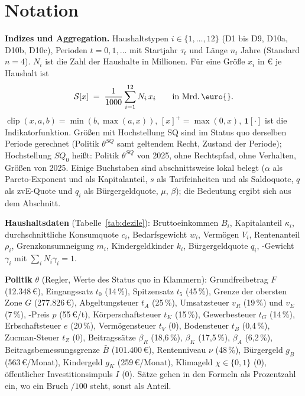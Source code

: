 %

\section{Notation}
\label{sec:notation}

\textbf{Indizes und Aggregation.} Haushaltstypen $i\in\{1,\dots,12\}$ (D1 bis D9, D10a, D10b,
D10c), Perioden $t=0,1,\dots$ mit Startjahr $\tau_t$ und Länge $n_t$ Jahre (Standard $n=4$).
$N_i$ ist die Zahl der Haushalte in Millionen. Für eine Größe $x_i$ in \euro{} je Haushalt ist
\begin{equation}
  \mathcal{S}[x] \;=\; \frac{1}{1000}\sum_{i=1}^{12} N_i\,x_i \qquad\text{in Mrd.\,\euro{}.}
\end{equation}
$\operatorname{clip}(x,a,b)=\min(b,\max(a,x))$, $[x]^+=\max(0,x)$, $\mathbf{1}[\cdot]$ ist die
Indikatorfunktion. Größen mit Hochstellung SQ sind im Status quo derselben Periode
gerechnet (Politik $\theta^{SQ}$ samt geltendem Recht, Zustand der Periode); Hochstellung
$SQ_0$ heißt: Politik $\theta^{SQ}$ von 2025, ohne Rechtspfad, ohne Verhalten, Größen von 2025.
Einige Buchstaben sind abschnittsweise lokal belegt ($\alpha$ als Pareto-Exponent und als
Kapitalanteil, $s$ als Tarifeinheiten und als Saldoquote, $q$ als zvE-Quote und $q_i$ als
Bürgergeldquote, $\mu$, $\beta$); die Bedeutung ergibt sich aus dem Abschnitt.

\textbf{Haushaltsdaten} (Tabelle~\ref{tab:dezile}): Bruttoeinkommen $B_i$, Kapitalanteil
$\kappa_i$, durchschnittliche Konsumquote $c_i$, Bedarfsgewicht $w_i$, Vermögen $V_i$,
Rentenanteil $\rho_i$, Grenzkonsumneigung $m_i$, Kindergeldkinder $k_i$, Bürgergeldquote $q_i$,
\COz-Gewicht $\gamma_i$ mit $\sum_i N_i\gamma_i=1$.

\textbf{Politik} $\theta$ (Regler, Werte des Status quo in Klammern): Grundfreibetrag $F$
(12.348\,\euro), Eingangssatz $t_0$ (14\,\%), Spitzensatz $t_5$ (45\,\%), Grenze der obersten
Zone $G$ (277.826\,\euro), Abgeltungsteuer $t_A$ (25\,\%), Umsatzsteuer $v_R$ (19\,\%) und
$v_E$ (7\,\%), \COz-Preis $p$ (55\,\euro/t), Körperschaftsteuer $t_K$ (15\,\%),
Gewerbesteuer $t_G$ (14\,\%), Erbschaftsteuer $e$ (20\,\%), Vermögensteuer $t_V$ (0), Bodensteuer
$t_B$ (0,4\,\%), Zucman-Steuer $t_Z$ (0), Beitragssätze $\beta_R$ (18,6\,\%), $\beta_K$ (17,5\,\%),
$\beta_A$ (6,2\,\%), Beitragsbemessungsgrenze $\bar B$ (101.400\,\euro), Rentenniveau $\nu$
(48\,\%), Bürgergeld $g_B$ (563\,\euro/Monat), Kindergeld $g_K$ (259\,\euro/Monat), Klimageld
$\chi\in\{0,1\}$ (0), öffentlicher Investitionsimpuls $I$ (0). Sätze gehen in den Formeln als
Prozentzahl ein, wo ein Bruch $/100$ steht, sonst als Anteil.

